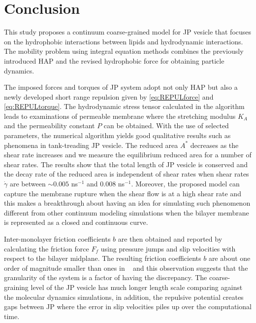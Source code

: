 \documentclass[lineno]{jfm}
\begin{document}
\section{\label{conclusion}Conclusion}




This study proposes a continuum coarse-grained model for JP vesicle that focuses on the 
hydrophobic interactions between lipids and hydrodynamic interactions.
The mobility problem using integral equation methods combines the previously introduced HAP and the 
revised hydrophobic force for obtaining particle dynamics. 



The imposed forces and torques of JP system adopt not only HAP but also a newly developed short 
range repulsion given by \ref{eq:REPULforce} and \ref{eq:REPULtorque}.
The hydrodynamic stress tensor calculated in the algorithm leads to examinations of permeable 
membrane where the stretching modulus $K_A$ and the permeability constant $P$ can be obtained.
%
With the use of selected parameters, the numerical algorithm yields good qualitative results such as
phenomena in tank-treading JP vesicle. The reduced area $A^*$ decreases as the shear rate increases
 and we measure the equilibrium reduced area for a number of shear rates. The results show that the total
 length of JP vesicle is conserved and the decay rate of the reduced area is independent of shear rates when shear rates $\dot\gamma$ are between $\sim0.005$ ns$^{-1}$ and $0.008$ ns$^{-1}$.
Moreover, the proposed model can capture the membrane rupture when the shear flow is at a high shear rate
and this makes a breakthrough about having an idea for simulating such phenomenon different from other continuum modeling simulations when the bilayer membrane is represented as a closed and continuous curve.


Inter-monolayer friction coefficients $b$ are then obtained and reported by calculating the friction force $F_f$
using pressure jumps and slip velocities with respect to the bilayer midplane.
The resulting friction coefficients $b$ are about one order of magnitude smaller than ones in
~\cite{denOtter2007} and this observation suggests that the granularity of the system is a factor of having 
the discrepancy. The coarse-graining level of the JP vesicle has much longer length scale comparing against
the molecular dynamics simulations, in addition, the repulsive potential creates gaps between JP where the 
error in slip velocities piles up over the computational time.
\end{document}
